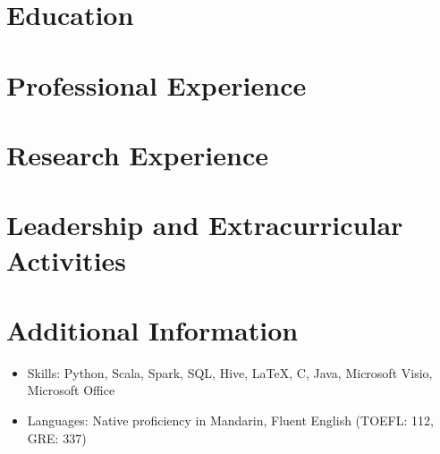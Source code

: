 \documentclass{resumeEN}
\begin{document}
\section{Education}

\thuundergrad
\umnexchange

\section{Professional Experience}

\bytedance
\continental

\section{Research Experience}

\fifaresearch

\section{Leadership and Extracurricular Activities}

\eydatascience

\section{Additional Information}

\vspace{0.618ex}
\begin{itemize}
\item Skills: Python, Scala, Spark, SQL, Hive, {\LaTeX}, C, Java, Microsoft Visio, Microsoft Office
\item Languages: Native proficiency in Mandarin, Fluent English (TOEFL: 112, GRE: 337)
\end{itemize}
\end{document}
